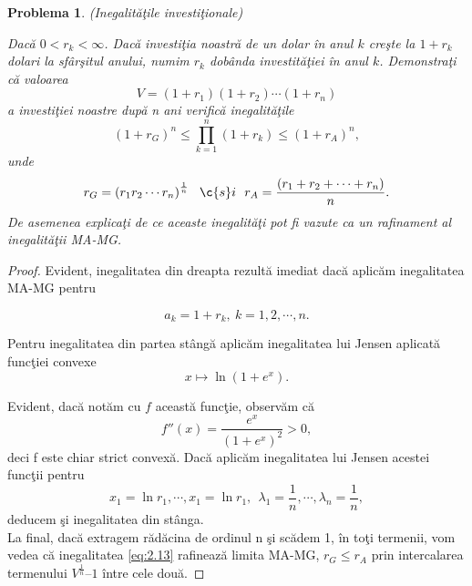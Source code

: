 \documentclass[a4paper,12pt,oneside]{report}
\newtheorem{problem}{Problema}
\begin{document}
\begin{problem} (Inegalit\u{a}\c{t}ile investi\c{t}ionale)

Dac\u{a} \(0< r_{k} < \infty\). Dac\u{a} investi\c{t}ia noastr\u{a} de un dolar \^{i}n anul \(k\) cre\c{s}te la \(1 +  r_{k}\) dolari la sf\^{a}r\c{s}itul anului, numim \(r_{k}\) dob\^{a}nda investit\u{a}\c{t}iei \^{i}n anul \(k\). Demonstra\c{t}i c\u{a} valoarea
\begin{displaymath}
  V = \left ( 1 + r_{1} \right )\left ( 1 + r_{2} \right )\cdots \left ( 1 + r_{n} \right )
\end{displaymath}
a investi\c{t}iei noastre dup\u{a} n ani verific\u{a} inegalit\u{a}\c{t}ile
\begin{displaymath}
  \left ( 1 + r_{G} \right )^{n} \leq \prod_{k = 1}^{n} \left ( 1 + r_{k} \right )\leq \left ( 1 + r_{A} \right )^{n}, \label{eq:2.13} \tag{2.13}
\end{displaymath}
unde
\begin{displaymath}
  r_{G} = \left ( r_{1}r_{2} \cdots r_{n}\right )^{\frac{1}{n}}~~ \c{s}i~~ r_{A} = \frac{\left ( r_{1} + r_{2} +  \cdots+ r_{n}\right )}{n}.
\end{displaymath}
De asemenea explica\c{t}i de ce aceaste inegalit\u{a}\c{t}i  pot fi vazute ca un rafinament al inegalit\u{a}\c{t}ii MA-MG.
\end{problem}

\begin{proof}
Evident, inegalitatea din dreapta rezult\u{a} imediat dac\u{a} aplic\u{a}m inegalitatea MA-MG pentru

\begin{displaymath}
  a_{k} = 1 + r_{k},~ k =1,2,\cdots, n.
\end{displaymath}

Pentru inegalitatea din partea st\^{a}ng\u{a} aplic\u{a}m inegalitatea lui Jensen aplicat\u{a} func\c{t}iei convexe
\[x \mapsto \ln\left ( 1 + e^{x} \right ).\]

Evident, dac\u{a} not\u{a}m cu $f$ aceast\u{a} func\c{t}ie, observ\u{a}m c\u{a}
\[
f''(x)=\frac{e^x}{(1+e^x)^2}>0,
\]
deci f este chiar strict convex\u{a}. Dac\u{a} aplic\u{a}m inegalitatea lui Jensen acestei func\c{t}ii pentru
\[
x_1=\ln r_1,\cdots, x_1=\ln r_1,~~\lambda_1=\frac{1}{n},\cdots, \lambda_n=\frac{1}{n},
\]
deducem \c{s}i inegalitatea din st\^{a}nga.\\
La final, dac\u{a} extragem r\u{a}d\u{a}cina de ordinul n \c{s}i sc\u{a}dem 1, \^{i}n to\c{t}i termenii, vom vedea c\u{a} inegalitatea \ref{eq:2.13} rafineaz\u{a} limita MA-MG,  \(r_{G} \leq r_{A}\) prin intercalarea termenului \(V^{\frac{1}{n}} – 1\) \^{i}ntre cele dou\u{a}.
\end{proof}
\end{document}
